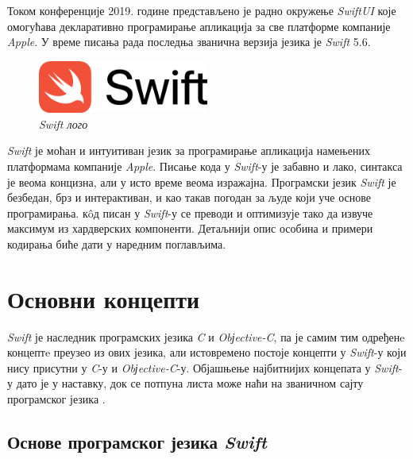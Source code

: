 \documentclass[12pt,oneside]{memoir}
\begin{document}
\indent Током конференције 2019. године представљено је радно окружење \textit{SwiftUI} \cite{Swift_SwiftUI} које омогућава декларативно програмирање апликација за све платформе компаније \textit{Apple}. У време писања рада последња званична верзија језика је \textit{Swift} 5.6.

\begin{figure}[H]
\includegraphics[width=0.5\textwidth]{images/Swift_logo.png}
\centering
\caption{\textit{Swift лого}}
\label{slika:swift_logo}
\end{figure}

\indent \textit{Swift} је моћан и интуитиван језик за програмирање апликација намењених платформама компаније \textit{Apple}. Писање кода у \textit{Swift}-у је забавно и лако, синтакса је веома концизна, али у исто време веома изражајна. Програмски језик \textit{Swift} је безбедан, брз и интерактиван, и као такав погодан за људе који уче основе програмирања. к\^{o}д писан у \textit{Swift}-у се преводи и оптимизује тако да извуче максимум из хардверских компоненти. Детаљнији опис особина и примери кодирања биће дати у наредним поглављима. 

\section{Основни концепти}
\label{sec:Концепти}

\indent \textit{Swift} је наследник програмских језика \textit{C} и \textit{Obјective-C}, па је самим тим одређенe концептe преузео из ових језика, али истовремено постоје концепти у \textit{Swift}-у који нису присутни у \textit{C}-у и \textit{Obјective-C}-у. Објашњење најбитнијих концепата у \textit{Swift}-у дато је у наставку, док се потпуна листа може наћи на званичном сајту програмског језика \cite{SwiftOfficialSite}.

\subsection{Основе програмског језика \textit{Swift}}
\end{document}
